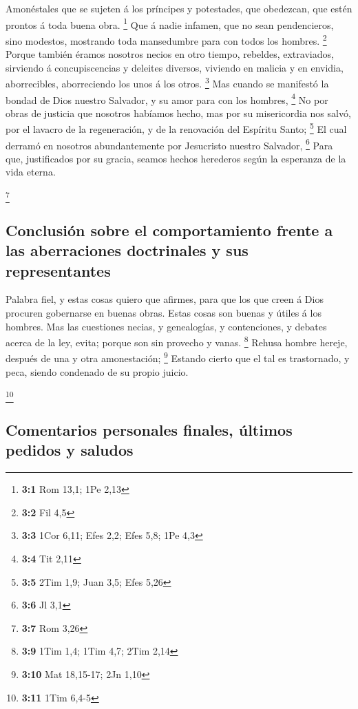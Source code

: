  Amonéstales que se sujeten á los príncipes y potestades,
que obedezcan, que estén prontos á toda buena obra. \footnote{\textbf{3:1}
  Rom 13,1; 1Pe 2,13}  Que á nadie infamen, que no sean
pendencieros, sino modestos, mostrando toda mansedumbre para con todos
los hombres. \footnote{\textbf{3:2} Fil 4,5}  Porque también
éramos nosotros necios en otro tiempo, rebeldes, extraviados, sirviendo
á concupiscencias y deleites diversos, viviendo en malicia y en envidia,
aborrecibles, aborreciendo los unos á los otros. \footnote{\textbf{3:3}
  1Cor 6,11; Efes 2,2; Efes 5,8; 1Pe 4,3}  Mas cuando se
manifestó la bondad de Dios nuestro Salvador, y su amor para con los
hombres, \footnote{\textbf{3:4} Tit 2,11}  No por obras de
justicia que nosotros habíamos hecho, mas por su misericordia nos salvó,
por el lavacro de la regeneración, y de la renovación del Espíritu
Santo; \footnote{\textbf{3:5} 2Tim 1,9; Juan 3,5; Efes 5,26}
 El cual derramó en nosotros abundantemente por Jesucristo
nuestro Salvador, \footnote{\textbf{3:6} Jl 3,1}  Para que,
justificados por su gracia, seamos hechos herederos según la esperanza
de la vida eterna.

\footnote{\textbf{3:7} Rom 3,26}

\hypertarget{conclusiuxf3n-sobre-el-comportamiento-frente-a-las-aberraciones-doctrinales-y-sus-representantes}{%
\subsection{Conclusión sobre el comportamiento frente a las aberraciones
doctrinales y sus
representantes}\label{conclusiuxf3n-sobre-el-comportamiento-frente-a-las-aberraciones-doctrinales-y-sus-representantes}}

 Palabra fiel, y estas cosas quiero que afirmes, para que
los que creen á Dios procuren gobernarse en buenas obras. Estas cosas
son buenas y útiles á los hombres.  Mas las cuestiones
necias, y genealogías, y contenciones, y debates acerca de la ley,
evita; porque son sin provecho y vanas. \footnote{\textbf{3:9} 1Tim 1,4;
  1Tim 4,7; 2Tim 2,14}  Rehusa hombre hereje, después de
una y otra amonestación; \footnote{\textbf{3:10} Mat 18,15-17; 2Jn 1,10}
 Estando cierto que el tal es trastornado, y peca, siendo
condenado de su propio juicio.

\footnote{\textbf{3:11} 1Tim 6,4-5}

\hypertarget{comentarios-personales-finales-uxfaltimos-pedidos-y-saludos}{%
\subsection{Comentarios personales finales, últimos pedidos y
saludos}\label{comentarios-personales-finales-uxfaltimos-pedidos-y-saludos}}

